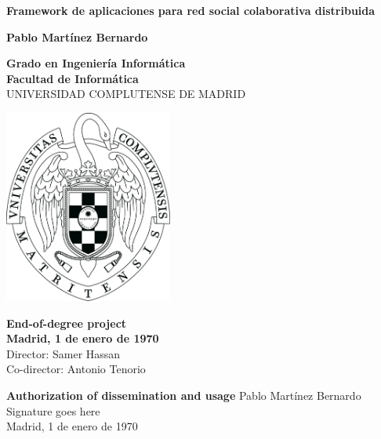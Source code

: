 \setcounter{page}{1}

\newpage
\thispagestyle{cover}
\begin{center}
  {\Huge \bf Framework de aplicaciones para red social colaborativa distribuida}

  \vfill
  {\LARGE\bf Pablo Martínez Bernardo}

  \vfill

  {\Large\bf Grado en Ingeniería Informática\\}
  {\Large\bf Facultad de Informática\\}
  \vspace*{0.2cm}
  {UNIVERSIDAD COMPLUTENSE DE MADRID}
  \vspace*{0.9cm}
  
   \begin{center}
   \includegraphics[width=157pt, height=180pt]{ucmlogo.png}
   \end{center}
  
  \vspace*{0.5cm}

  {\large\bf End-of-degree project\\
             Madrid, 1 de enero de 1970\\}
  \vspace*{0.7cm}
  {\large Director: Samer Hassan\\
          Co-director: Antonio Tenorio}
  \rhead{}
  \rfoot{}
  \fancyhf{}

\end{center}



\newpage
\thispagestyle{empty}
\begin{center}
  \textbf{\Huge Authorization of dissemination and usage}
  \vfill
  {\Large Pablo Martínez Bernardo\\}
  \vspace*{1cm}
  {\Huge Signature goes here\\}
  \vspace*{1cm}
  {\Large Madrid, 1 de enero de 1970}
  \vfill
\end{center}

